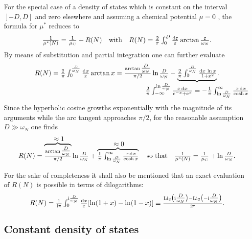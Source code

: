 For the special case of a density of states which is constant on the interval
$[-D, D]$ and zero elsewhere and assuming a chemical potential $\mu = 0$
\cite[39]{AllenMitrovic82}, the formula for $\mu^*$ reduces to
%
\begin{equation*}
    \frac 1 {\mu^*(N)} = \frac 1 {\mu \sub C} + R(N)
    \quad \text{with} \quad
    R(N) = \frac 2 \pi \int_0^D \frac {\D \epsilon} \epsilon
    \arctan \frac \epsilon {\omega_N}.
\end{equation*}
%
By means of substitution and partial integration one can further evaluate
%
\begin{equation*}
    R(N) = \frac 2 \pi \int_0^{\frac D {\omega_N}} \frac {\D x} x \arctan x
    = \frac{\arctan \tfrac D {\omega_N}}{\pi / 2} \ln \frac D {\omega_N}
    - \hypo
        {\frac 2 \pi \int_0^{\frac D {\omega_N}} \frac{\D x \, \ln x}{1 + x^2}}
        { \frac 2 \pi \int_{-\infty}^{\ln \frac D {\omega_N}}
        \frac{x \, \D x}{\E^{-x} + \E^x}
        = -\frac 1 \pi \int_{\ln \frac D {\omega_N}}^\infty
        \frac{x \, \D x}{\cosh x} }.
\end{equation*}
%
Since the hyperbolic cosine growths exponentially with the magnitude of its
arguments while the arc tangent approaches $\pi / 2$, for the reasonable
assumption $D \gg \omega_N$ one finds
%
\begin{equation} \label{rectangular-DOS mu*}
R(N) = \hyper{\frac{\arctan \tfrac D {\omega_N}}{\pi / 2}}{\approx 1}
\ln \frac D {\omega_N}
+ \hyper{
    \frac 1 \pi \int_{\ln \frac D {\omega_N}}^\infty
    \frac{x \, \D x}{\cosh x}
    }
    {\approx 0}
\quad \text{so that} \quad
\frac 1 {\mu^*(N)} = \frac 1 {\mu \sub C} + \ln \frac D {\omega_N}.
\end{equation}

For the sake of completeness it shall also be mentioned that an exact evaluation
of $R(N)$ is possible in terms of dilogarithms:
%
\begin{equation*}
    R(N) = \frac 1 {\I \pi} \int_0^{\I \frac D {\omega_N}} \frac {\D x} x
    [\ln(1 + x) - \ln(1 - x)]
    \equiv \frac
        { \mathrm{Li}_2 \big(  \I \tfrac D {\omega_N} \big)
        - \mathrm{Li}_2 \big( -\I \tfrac D {\omega_N} \big) }
        {\I \pi}.
\end{equation*}

\subsection{Constant density of states}

